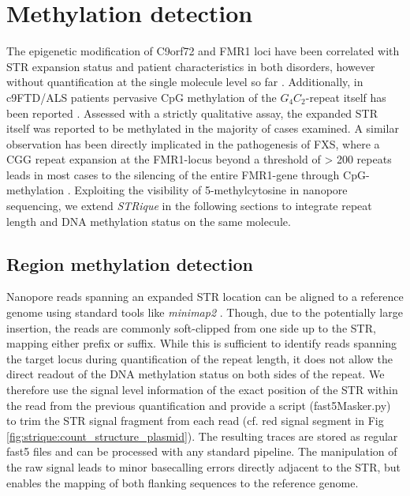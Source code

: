 \section{Methylation detection}
\label{sec:strique:modifications}

The epigenetic modification of C9orf72 and FMR1 loci have been correlated with STR expansion status and patient characteristics in both disorders, however without quantification at the single molecule level so far \cite{Russ2015, Hornstra1993}. Additionally, in c9FTD/ALS patients pervasive CpG methylation of the $ G_{4}C_{2} $-repeat itself has been reported \cite{Xi2015}. Assessed with a strictly qualitative assay, the expanded STR itself was reported to be methylated in the majority of cases examined. A similar observation has been directly implicated in the pathogenesis of FXS, where a CGG repeat expansion at the FMR1-locus beyond a threshold of > 200 repeats leads in most cases to the silencing of the entire FMR1-gene through CpG-methylation \cite{Lyons2015}. Exploiting the visibility of 5-methylcytosine in nanopore sequencing, we extend \textit{STRique} in the following sections to integrate repeat length and DNA methylation status on the same molecule.


\subsection{Region methylation detection}
\label{subsec:strique:modifications_region}

Nanopore reads spanning an expanded STR location can be aligned to a reference genome using standard tools like \textit{minimap2} \cite{Li2018}. Though, due to the potentially large insertion, the reads are commonly soft-clipped from one side up to the STR, mapping either prefix or suffix. While this is sufficient to identify reads spanning the target locus during quantification of the repeat length, it does not allow the direct readout of the DNA methylation status on both sides of the repeat. We therefore use the signal level information of the exact position of the STR within the read from the previous quantification and provide a script (fast5Masker.py) to trim the STR signal fragment from each read (cf. red signal segment in Fig \ref{fig:strique:count_structure_plasmid}). The resulting traces are stored as regular fast5 files and can be processed with any standard pipeline. The manipulation of the raw signal leads to minor basecalling errors directly adjacent to the STR, but enables the mapping of both flanking sequences to the reference genome.


